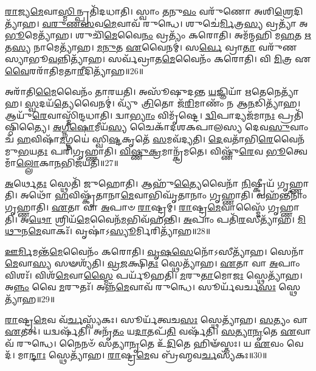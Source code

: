 \-\ul{𑌰𑌾}\-𑌜𑍍𑌯\-\ul{𑌮𑍇}\-𑌵𑌾\-\ul{𑌸𑍍𑌮𑌿}\-𑌨𑍍𑌪𑍍𑌰𑌤𑌿᳴\-𑌦𑌧𑌾𑌤𑌿।
𑌸𑍍𑌵𑌾𑌂 \ul{𑌤}\-𑌨𑍁\-\ul{𑌵𑌂} 𑌵𑌰𑍁᳴𑌣𑍋 𑌅𑌶𑌿\-\ul{𑌶𑍍𑌰𑍇}\-𑌦𑌿\-𑌤𑍍𑌯𑌾᳴𑌹।
\-\ul{𑌵}\-\-\ul{𑌰𑍁}\-\-\ul{𑌣}\-\-\ul{𑌸}\-𑌵\-\ul{𑌮𑍇}\-𑌵𑌾𑌵᳴ 𑌰𑍁𑌨𑍍𑌧𑍇।
𑌶𑍁𑌚𑍇॑\-\ul{𑌰𑍍𑌮𑌿}\-𑌤𑍍𑌰\-\ul{𑌸𑍍𑌯} 𑌵𑍍𑌰𑌤𑍍𑌯𑌾᳴ 𑌅\-\ul{𑌭𑍂}\-𑌮𑍇𑌤𑍍𑌯𑌾᳴𑌹।
𑌶𑍁𑌚𑌿᳴\-\ul{𑌮𑍇}\-𑌵𑍈\-\ul{𑌨𑌂} 𑌵𑍍𑌰𑌤𑍍𑌯𑌂᳴ 𑌕𑌰𑍋𑌤𑌿।
𑌅𑌮᳴𑌨𑍍𑌮𑌹𑌿 𑌮\-\ul{𑌹}\-𑌤 \ul{𑌋}\-𑌤\-\ul{𑌸𑍍𑌯} 𑌨𑌾𑌮𑍇𑌤𑍍𑌯𑌾᳴𑌹।
\-\ul{𑌮}\-\-\ul{𑌨𑍁}\-𑌤 \ul{𑌏}\-𑌵𑍈𑌨𑌮𑍍॑।
𑌸\-\ul{𑌰𑍍𑌵𑍇} 𑌵𑍍𑌰𑌾\-\ul{𑌤𑌾} 𑌵𑌰𑍁᳴𑌣𑌸𑍍𑌯𑌾𑌭𑍂\-\ul{𑌵}\-𑌨𑍍𑌨𑌿𑌤𑍍𑌯𑌾᳴𑌹।
𑌸𑌰𑍍𑌵᳴𑌵𑍍𑌰𑌾𑌤\-\ul{𑌮𑍇}\-𑌵𑍈𑌨𑌂᳴ 𑌕𑌰𑍋𑌤𑌿।
𑌵𑌿 \ul{𑌮𑌿}\-𑌤𑍍𑌰 𑌏\-\ul{𑌵𑍈}\-𑌰𑌰𑌾᳴𑌤𑌿𑌮𑌤𑌾\-\ul{𑌰𑍀}\-𑌦𑌿𑌤𑍍𑌯𑌾᳴𑌹॥26॥

𑌅𑌰𑌾᳴𑌤𑌿\-\ul{𑌮𑍈}\-𑌵𑍈𑌨𑌂᳴ 𑌤𑌾𑌰𑌯𑌤𑌿।
𑌅𑌸𑍂᳴𑌷𑍁𑌦𑌨𑍍𑌤 \ul{𑌯}\-𑌜𑍍𑌞𑌿𑌯𑌾᳴ \ul{𑌋}\-𑌤𑍇𑌨𑍇𑌤𑍍𑌯𑌾᳴𑌹।
\-\ul{𑌸𑍍𑌵}\-𑌦𑌯᳴\-\ul{𑌤𑍍𑌯𑍇}\-𑌵𑍈𑌨𑌮𑍍॑।
𑌵𑍍𑌯𑍁᳴ \ul{𑌤𑍍𑌰𑌿}\-𑌤𑍋 𑌜᳴\-\ul{𑌰𑌿}\-𑌮𑌾𑌣𑌂᳴ 𑌨 𑌆\-\ul{𑌨}\-𑌡𑌿𑌤𑍍𑌯𑌾᳴𑌹।
𑌆𑌯𑍁᳴\-\ul{𑌰𑍇}\-𑌵𑌾𑌸𑍍𑌮𑌿᳴𑌨𑍍𑌦𑌧𑌾𑌤𑌿।
𑌦𑍍𑌵𑌾\-\ul{𑌭𑍍𑌯𑌾𑌂} 𑌵𑌿𑌮𑍃᳴𑌷𑍍𑌟𑍇।
\-\ul{𑌦𑍍𑌵𑌿}\-𑌪𑌾𑌦𑍍𑌯𑌜᳴𑌮𑌾\-\ul{𑌨𑌃} 𑌪𑍍𑌰𑌤𑌿᳴\-𑌷𑍍𑌠𑌿𑌤𑍍𑌯𑍈।
\-\ul{𑌅}\-\-\ul{𑌗𑍍𑌨𑍀}\-\-\ul{𑌷𑍋}\-𑌮𑍀𑌯᳴\-\ul{𑌸𑍍𑌯} 𑌚𑍈𑌕𑌾᳴\-𑌦𑌶\-𑌕𑌪𑌾𑌲𑌸𑍍𑌯 𑌦𑍇𑌵\-\ul{𑌸𑍁}\-𑌵𑌾𑌂 𑌚᳴ \ul{𑌹}\-𑌵𑌿𑌷𑌾᳴\-\ul{𑌮}\-𑌗𑍍𑌨𑌯𑍇॑ 𑌸𑍍𑌵𑌿\-\ul{𑌷𑍍𑌟}\-𑌕𑍃𑌤𑍇᳴ \ul{𑌸}\-𑌮𑌵᳴𑌦𑍍𑌯𑌤𑌿।
\-\ul{𑌦𑍇}\-𑌵𑌤𑌾᳴𑌭𑌿\-\ul{𑌰𑍇}\-𑌵𑍈𑌨᳴𑌮𑍁\-\ul{𑌭}\-𑌯\-\ul{𑌤𑌃} 𑌪𑌰𑌿᳴𑌗𑍃𑌹𑍍𑌣𑌾𑌤𑌿।
\-\ul{𑌵𑌿}\-\-\ul{𑌷𑍍𑌣𑍁}\-\-\ul{𑌕𑍍𑌰}\-𑌮𑌾𑌨𑍍𑌕𑍍𑌰᳴𑌮𑌤𑍇।
𑌵𑌿𑌷𑍍𑌣𑍁᳴\-\ul{𑌰𑍇}\-𑌵 \ul{𑌭𑍂}\-𑌤𑍍𑌵𑍇𑌮𑌾𑌁\-\ul{𑌲𑍍𑌲𑍋}\-𑌕𑌾\-\ul{𑌨}\-𑌭𑌿\-𑌜᳴𑌯𑌤𑌿॥27॥\anuvakamend[\-\ul{𑌸}\-𑌤𑍍𑌯𑌾𑌨𑌾᳴𑌮\-\ul{𑌧𑌾}\-𑌯𑍀𑌤𑍍𑌯𑌾᳴𑌹𑌾𑌤𑌾\-\ul{𑌰𑍀}\-𑌦𑌿𑌤𑍍𑌯𑌾᳴𑌹 𑌕𑍍𑌰𑌮\-\ul{𑌤} 𑌏𑌕𑌂᳴ 𑌚]

\-\ul{𑌅}\-𑌰𑍍𑌥𑍇\-\ul{𑌤𑌃} 𑌸𑍍𑌥𑍇𑌤𑌿᳴ 𑌜𑍁𑌹𑍋𑌤𑌿।
𑌆𑌹𑍁᳴\-\ul{𑌤𑍍𑌯𑍈}\-𑌵𑍈𑌨𑌾᳴ \ul{𑌨𑌿}\-𑌷𑍍𑌕𑍍𑌰𑍀𑌯᳴ 𑌗𑍃𑌹𑍍𑌣𑌾𑌤𑌿।
𑌅𑌥𑍋᳴ \ul{𑌹}\-𑌵𑌿𑌷𑍍𑌕𑍃᳴𑌤𑌾𑌨𑌾\-\ul{𑌮𑍇}\-𑌵𑌾𑌭𑌿𑌘𑍃᳴𑌤𑌾𑌨𑌾𑌂 𑌗𑍃𑌹𑍍𑌣𑌾𑌤𑌿।
𑌵𑌹᳴𑌨𑍍𑌤𑍀𑌨𑌾𑌂 𑌗𑍃𑌹𑍍𑌣𑌾𑌤𑌿।
\-\ul{𑌏}\-𑌤𑌾 𑌵𑌾 \ul{𑌅}\-𑌪𑌾𑍞 \ul{𑌰𑌾}\-𑌷𑍍𑌟𑍍𑌰𑌮𑍍।
\-\ul{𑌰𑌾}\-𑌷𑍍𑌟𑍍𑌰\-\ul{𑌮𑍇}\-𑌵𑌾𑌸𑍍𑌮𑍈᳴ 𑌗𑍃𑌹𑍍𑌣𑌾𑌤𑌿।
𑌅\-\ul{𑌥𑍋} 𑌶𑍍𑌰𑌿𑌯᳴\-\ul{𑌮𑍇}\-𑌵𑍈𑌨᳴\-\ul{𑌮}\-𑌭𑌿𑌵᳴𑌹𑌨𑍍𑌤𑌿।
\-\ul{𑌅}\-𑌪𑌾𑌂 𑌪𑌤𑌿᳴\-\ul{𑌰}\-𑌸𑍀𑌤𑍍𑌯𑌾᳴𑌹।
\-\ul{𑌮𑌿}\-\-\ul{𑌥𑍁}\-𑌨\-\ul{𑌮𑍇}\-𑌵𑌾𑌕𑌃᳴।
𑌵𑍃𑌷𑌾॑\-𑌽\-\ul{𑌸𑍍𑌯𑍂}\-𑌰𑍍𑌮𑌿𑌰𑌿𑌤𑍍𑌯𑌾᳴𑌹॥28॥

\-\ul{𑌊}\-\-\ul{𑌰𑍍𑌮𑌿}\-𑌮𑌨𑍍𑌤᳴\-\ul{𑌮𑍇}\-𑌵𑍈𑌨𑌂᳴ 𑌕𑌰𑍋𑌤𑌿।
\-\ul{𑌵𑍃}\-\-\ul{𑌷}\-\-\ul{𑌸𑍇}\-𑌨𑍋᳴\-𑌽𑌸𑍀𑌤𑍍𑌯𑌾᳴𑌹।
𑌸𑍇𑌨𑌾᳴\-\ul{𑌮𑍇}\-𑌵𑌾\-\ul{𑌸𑍍𑌯} 𑌸𑍟𑌶𑍍𑌯᳴𑌤𑌿।
\-\ul{𑌵𑍍𑌰}\-\-\ul{𑌜}\-𑌕𑍍𑌷𑌿\-\ul{𑌤𑌃} 𑌸𑍍𑌥𑍇𑌤𑍍𑌯𑌾᳴𑌹।
\-\ul{𑌏}\-𑌤𑌾 𑌵𑌾 \ul{𑌅}\-𑌪𑌾𑌂 𑌵𑌿𑌶𑌃᳴।
𑌵𑌿𑌶᳴\-\ul{𑌮𑍇}\-𑌵𑌾\-\ul{𑌸𑍍𑌮𑍈} 𑌪𑌰𑍍𑌯𑍂᳴𑌹𑌤𑌿।
\-\ul{𑌮}\-𑌰𑍁\-\ul{𑌤𑌾}\-𑌮𑍋\-\ul{𑌜𑌃} 𑌸𑍍𑌥𑍇𑌤𑍍𑌯𑌾᳴𑌹।
𑌅\-\ul{𑌨𑍍𑌨𑌂} 𑌵𑍈 \ul{𑌮}\-𑌰𑍁𑌤𑌃᳴।
𑌅𑌨𑍍𑌨᳴\-\ul{𑌮𑍇}\-𑌵𑌾𑌵᳴ 𑌰𑍁𑌨𑍍𑌧𑍇।
𑌸𑍂𑌰𑍍𑌯᳴𑌵𑌰𑍍𑌚\-\ul{𑌸𑌃} 𑌸𑍍𑌥𑍇𑌤𑍍𑌯𑌾᳴𑌹॥29॥

\-\ul{𑌰𑌾}\-𑌷𑍍𑌟𑍍𑌰\-\ul{𑌮𑍇}\-𑌵 𑌵᳴\-\ul{𑌰𑍍𑌚}\-𑌸𑍍𑌵𑍍𑌯᳴𑌕𑌃।
𑌸𑍂𑌰𑍍𑌯᳴𑌤𑍍𑌵𑌚\-\ul{𑌸𑌃} 𑌸𑍍𑌥𑍇𑌤𑍍𑌯𑌾᳴𑌹।
\-\ul{𑌸}\-𑌤𑍍𑌯𑌂 𑌵𑌾 \ul{𑌏}\-𑌤𑌤𑍍।
𑌯𑌦𑍍𑌵𑌰𑍍\mbox{}𑌷᳴𑌤𑌿।
𑌅𑌨𑍃᳴\-\ul{𑌤𑌂} 𑌯\-\ul{𑌦𑌾}\-𑌤𑌪᳴\-\ul{𑌤𑌿} 𑌵𑌰𑍍\mbox{}𑌷᳴𑌤𑌿।
\-\ul{𑌸}\-\-\ul{𑌤𑍍𑌯𑌾}\-\-\ul{𑌨𑍃}\-𑌤𑍇 \ul{𑌏}\-𑌵𑌾𑌵᳴ 𑌰𑍁𑌨𑍍𑌧𑍇।
𑌨𑍈𑌨𑍞᳴ 𑌸𑌤𑍍𑌯𑌾\-\ul{𑌨𑍃}\-𑌤𑍇 𑌉᳴\-\ul{𑌦𑌿}\-𑌤𑍇 𑌹𑌿𑍟᳴𑌸𑍍𑌤𑌃।
𑌯 \ul{𑌏}\-𑌵𑌂 𑌵𑍇𑌦᳴।
𑌮𑌾\-\ul{𑌨𑍍𑌦𑌾𑌃} 𑌸𑍍𑌥𑍇𑌤𑍍𑌯𑌾᳴𑌹।
\-\ul{𑌰𑌾}\-𑌷𑍍𑌟𑍍𑌰\-\ul{𑌮𑍇}\-𑌵 𑌬𑍍𑌰᳴𑌹𑍍𑌮𑌵\-\ul{𑌰𑍍𑌚}\-𑌸𑍍𑌯᳴𑌕𑌃॥30॥

